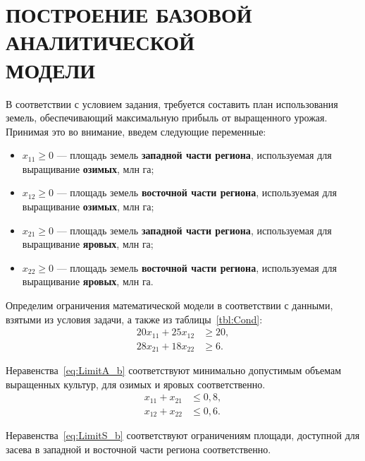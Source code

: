 \section[Построение базовой аналитической модели]{ПОСТРОЕНИЕ БАЗОВОЙ АНАЛИТИЧЕСКОЙ \\ МОДЕЛИ}

В соответствии с условием задания, требуется составить план использования земель,
обеспечивающий максимальную прибыль от выращенного урожая. 
Принимая это во внимание, введем следующие переменные:

\begin{itemize}

\item
  $ x_{11} \ge 0 $ --- площадь земель \textbf{западной части региона}, используемая для выращивание \textbf{озимых}, млн га;
\item
  $ x_{12} \ge 0 $ --- площадь земель \textbf{восточной части региона}, используемая для выращивание \textbf{озимых}, млн га;
\item
  $ x_{21} \ge 0 $ --- площадь земель \textbf{западной части региона}, используемая для выращивание \textbf{яровых}, млн га;
\item
  $ x_{22} \ge 0 $ --- площадь земель \textbf{восточной части региона}, используемая для выращивание \textbf{яровых}, млн га.

\end{itemize}

Определим ограничения математической модели в соответствии с данными, взятыми из условия задачи, а также из таблицы~\ref{tbl:Cond}:
\begin{equation}
  \label{eq:LimitA_b}
  \begin{aligned}
    20x_{11} + 25x_{12} & \ge 20, \\
    28x_{21} + 18x_{22} & \ge 6.
  \end{aligned}
\end{equation}

Неравенства~\eqref{eq:LimitA_b} соответствуют минимально допустимым объемам выращенных культур, для озимых и яровых соответственно.
\begin{equation}
  \label{eq:LimitS_b}
  \begin{aligned}
    x_{11} + x_{21} & \le 0{,}8, \\
    x_{12} + x_{22} & \le 0{,}6.
  \end{aligned}
\end{equation}

Неравенства~\eqref{eq:LimitS_b} соответствуют ограничениям площади, доступной для засева в западной и восточной части региона соответственно.

